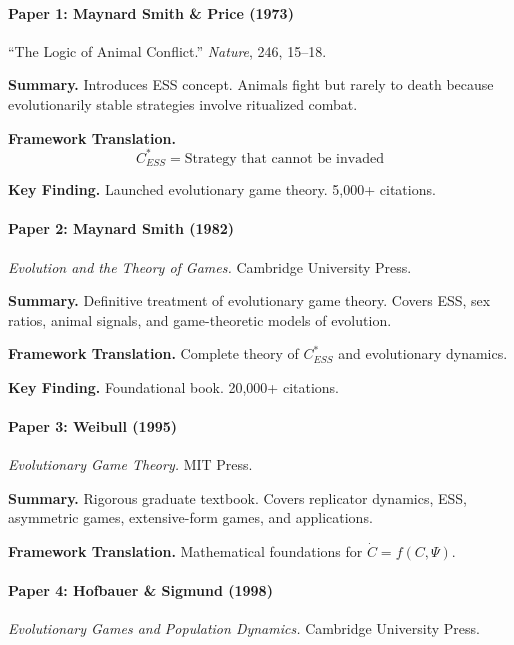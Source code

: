 \paragraph{Paper 1: Maynard Smith \& Price (1973)}

``The Logic of Animal Conflict.''
\textit{Nature}, 246, 15--18.

\textbf{Summary.}
Introduces ESS concept. Animals fight but rarely to death because 
evolutionarily stable strategies involve ritualized combat.

\textbf{Framework Translation.}
\begin{equation}
C^*_{ESS} = \text{Strategy that cannot be invaded}
\end{equation}

\textbf{Key Finding.}
Launched evolutionary game theory. 5,000+ citations.

\paragraph{Paper 2: Maynard Smith (1982)}

\textit{Evolution and the Theory of Games.}
Cambridge University Press.

\textbf{Summary.}
Definitive treatment of evolutionary game theory. Covers ESS, sex ratios, 
animal signals, and game-theoretic models of evolution.

\textbf{Framework Translation.}
Complete theory of $C^*_{ESS}$ and evolutionary dynamics.

\textbf{Key Finding.}
Foundational book. 20,000+ citations.

\paragraph{Paper 3: Weibull (1995)}

\textit{Evolutionary Game Theory.}
MIT Press.

\textbf{Summary.}
Rigorous graduate textbook. Covers replicator dynamics, ESS, asymmetric 
games, extensive-form games, and applications.

\textbf{Framework Translation.}
Mathematical foundations for $\dot{C} = f(C, \Psi)$.

\paragraph{Paper 4: Hofbauer \& Sigmund (1998)}

\textit{Evolutionary Games and Population Dynamics.}
Cambridge University Press.

